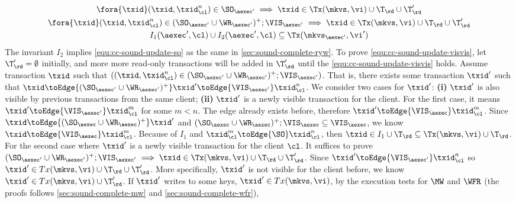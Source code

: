 \begin{gather}
    \fora{\txid} (\txid, \txid_\cl^n) \in \SO_{\aexec'} \implies \txid \in \Tx(\mkvs, \vi) \cup \T_\rd \cup \T'_\rd \label{equ:cc-sound-update-so}\\
    \fora{\txid} (\txid, \txid_\cl^n) \in ( \SO_{\aexec'} \cup \WR_{\aexec'} )^{+} ; \VIS_{\aexec'} \implies \txid \in \Tx(\mkvs, \vi) \cup \T_\rd \cup \T'_\rd \label{equ:cc-sound-update-visvis}\\
    I_1(\aexec',\cl) \cup I_2(\aexec',\cl) \subseteq \Tx(\mkvs_{\aexec'}, \vi') \label{equ:cc-sound-inv} 
\end{gather}
The invariant \( I_2 \) implies \cref{equ:cc-sound-update-so} as the same in \cref{sec:sound-complete-ryw}.
To prove \cref{equ:cc-sound-update-visvis}, let \( \T'_\rd = \emptyset \) initially,
and more more read-only transactions will be added in \( \T'_\rd \) until the \cref{equ:cc-sound-update-visvis} holds.
Assume transaction \( \txid \) such that \( ((\txid, \txid_\cl^n) \in ( \SO_{\aexec'} \cup \WR_{\aexec'} )^{+} ; \VIS_{\aexec'}) \).
That is, there exists some transaction \( \txid' \) such that
\( \txid \toEdge{( \SO_{\aexec'} \cup \WR_{\aexec'} )^+}  \txid' \toEdge{\VIS_{\aexec'}} \txid_\cl^n\).
We consider two cases for \( \txid' \): \textbf{(i)} \( \txid' \) is also visible by previous transactions from the same client; 
\textbf{(ii)} \( \txid' \) is a newly visible transaction for the client.
For the first case, it means \( \txid' \toEdge{\VIS_{\aexec'}} \txid_\cl^m \) for some \( m < n \).
The edge already exists before, therefore \( \txid' \toEdge{\VIS_\aexec} \txid_\cl^m \).
Since \( \txid \toEdge{( \SO_{\aexec} \cup \WR_{\aexec} )^{+}}  \txid' \) and \( ( \SO_{\aexec} \cup \WR_{\aexec} )^{+} ; \VIS_{\aexec} \subseteq \VIS_{\aexec} \),
we know \( \txid \toEdge{ \VIS_{\aexec} }  \txid_\cl^m  \).
Because of \( I_1 \) and \( \txid_\cl^m \toEdge{\SO} \txid_\cl^n \), then \( \txid \in I_1 \cup \T_\rd \subseteq \Tx(\mkvs, \vi) \cup \T_\rd \).
For the second case where \( \txid' \) is a newly visible transaction for the client \( \cl \).
It suffices to prove \( ( \SO_{\aexec'} \cup \WR_{\aexec'} )^{+} ; \VIS_{\aexec'} \implies \txid \in \Tx(\mkvs, \vi) \cup \T_\rd \cup \T'_\rd \).
Since \( \txid' \toEdge{\VIS_{\aexec'}} \txid_\cl^n \) so \( \txid' \in Tx(\mkvs, \vi) \cup \T_\rd \cup \T'_\rd\).
More specifically, \( \txid' \) is not visible for the client before, we know \( \txid' \in Tx(\mkvs, \vi) \cup \T'_\rd\).
If \( \txid' \) writes to some keys, \ie \( \txid' \in Tx(\mkvs, \vi) \), 
by the execution tests for \( \MW \) and \( \WFR \) (the proofs follows \cref{sec:sound-complete-mw} and \cref{sec:sound-complete-wfr}),
